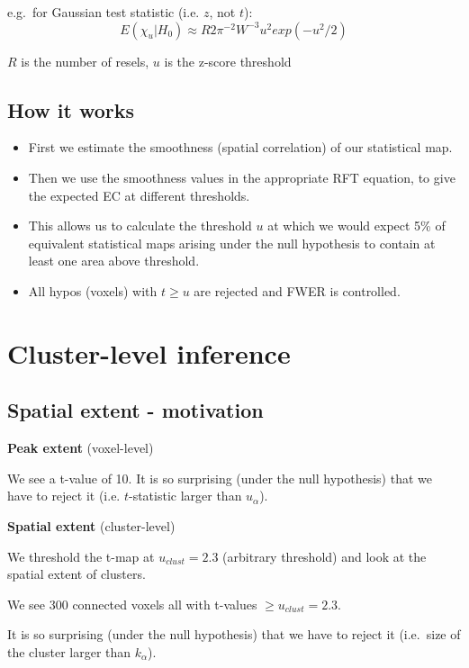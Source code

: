 \documentclass[]{article}
\providecommand{\tightlist}{%
  \setlength{\itemsep}{0pt}\setlength{\parskip}{0pt}}
\begin{document}
e.g.~for Gaussian test statistic (i.e. \(z\), not \(t\)):
\[E(\chi_u|H_0)\approx R 2\pi^{-2}W^{-3} u^{2} exp(-u^2/2)\]

\(R\) is the number of resels, \(u\) is the z-score threshold

\subsection{How it works}\label{how-it-works}

\begin{itemize}
\tightlist
\item
  First we estimate the smoothness (spatial correlation) of our
  statistical map.
\item
  Then we use the smoothness values in the appropriate RFT equation, to
  give the expected EC at different thresholds.
\item
  This allows us to calculate the threshold \(u\) at which we would
  expect 5\% of equivalent statistical maps arising under the null
  hypothesis to contain at least one area above threshold.
\item
  All hypos (voxels) with \(t\geq u\) are rejected and FWER is
  controlled.
\end{itemize}

\section{Cluster-level inference}\label{cluster-level-inference-1}

\subsection{Spatial extent -
motivation}\label{spatial-extent---motivation}

\textbf{Peak extent} (voxel-level)

We see a t-value of 10. It is so surprising (under the null hypothesis)
that we have to reject it (i.e. \(t\)-statistic larger than
\(u_\alpha\)).

\textbf{Spatial extent} (cluster-level)

We threshold the t-map at \(u_{clust}=2.3\) (arbitrary threshold) and
look at the spatial extent of clusters.

We see 300 connected voxels all with t-values \(\geq u_{clust}=2.3\).

It is so surprising (under the null hypothesis) that we have to reject
it (i.e.~size of the cluster larger than \(k_\alpha\)).
\end{document}
